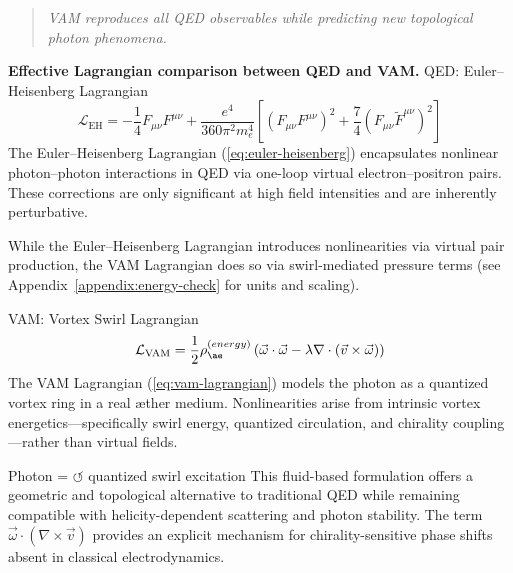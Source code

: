 \begin{quote}
        \emph{VAM reproduces all QED observables while predicting new topological photon phenomena.}
\end{quote}


\textbf{Effective Lagrangian comparison between QED and VAM.}
QED: Euler–Heisenberg Lagrangian
\[\mathcal{L}_{\mathrm{EH}} = -\frac{1}{4}F_{\mu\nu}F^{\mu\nu} + \frac{e^4}{360\pi^2 m_e^4}\left[(F_{\mu\nu}F^{\mu\nu})^2 + \frac{7}{4}(F_{\mu\nu}\tilde{F}^{\mu\nu})^2\right]\]
The Euler–Heisenberg Lagrangian (\ref{eq:euler-heisenberg}) encapsulates nonlinear photon–photon interactions in QED via one-loop virtual electron–positron pairs. These corrections are only significant at high field intensities and are inherently perturbative.

While the Euler–Heisenberg Lagrangian introduces nonlinearities via virtual pair production, the VAM Lagrangian does so via swirl-mediated pressure terms (see Appendix~\ref{appendix:energy-check} for units and scaling).



VAM: Vortex Swirl Lagrangian
\[\mathcal{L}_{\mathrm{VAM}} = \frac{1}{2} \rho_{\ae}^{(energy)} \left( \vec{\omega} \cdot \vec{\omega} - \lambda \nabla \cdot (\vec{v} \times \vec{\omega}) \right)\]
The VAM Lagrangian (\ref{eq:vam-lagrangian}) models the photon as a quantized vortex ring in a real æther medium. Nonlinearities arise from intrinsic vortex energetics—specifically swirl energy, quantized circulation, and chirality coupling—rather than virtual fields.

Photon = $\circlearrowleft$ quantized swirl excitation
This fluid-based formulation offers a geometric and topological alternative to traditional QED while remaining compatible with helicity-dependent scattering and photon stability. The term \( \vec{\omega} \cdot (\nabla \times \vec{v}) \) provides an explicit mechanism for chirality-sensitive phase shifts absent in classical electrodynamics.